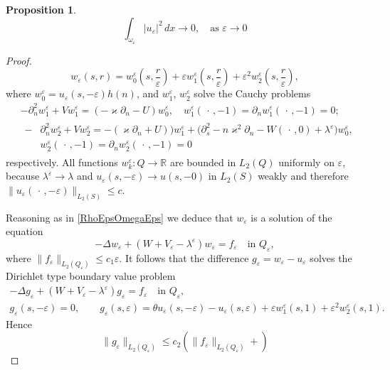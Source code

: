 \documentclass[reqno]{amsart}
\theoremstyle{plain}
\newtheorem{prop}{Proposition}
\numberwithin{equation}{section}
\renewcommand{\kappa}{\varkappa}
\newcommand{\Real}{\mathbb R}
\newcommand{\eps}{\varepsilon}
\renewcommand{\leq}{\leqslant}
\newcommand\nep{\textstyle\frac r\eps}
\newcommand{\pte}{\partial_n}
\begin{document}
\begin{prop}
  \begin{equation*}
    \int_{\omega_\eps}|u_\eps|^2\,dx\to 0,\quad\text{as } \eps\to 0
  \end{equation*}
\end{prop}
\begin{proof}
  \begin{equation*}
    w_\eps(s,r)=w_0^\eps\left(s,\nep\right)+\eps w_1^\eps\left(s,\nep\right)
    +\eps^2 w_2^\eps\left(s,\nep\right),
  \end{equation*}
 where $w_0^\eps=u_\eps(s,-\eps)h(n)$, and $w_1^\eps$, $w_2^\eps$ solve the Cauchy problems
 \begin{align*}
  &-\pte^2 w_1^\eps+Vw_1^\eps=(-\kappa\pte -U)w_0^\eps, \quad w_1^\eps(\,\cdot\,,-1)= \pte w_1^\eps(\,\cdot\,,-1)=0;\\
  &\begin{aligned}
  -&\pte^2 w_2^\eps+Vw_2^\eps=-(\kappa\pte +U)) w_1^\eps
  +\big(\partial^2_s-n\kappa^2\partial_n-W(\,\cdot\,,0)+\lambda^\eps\big)w_0^\eps, \\
   &w_2^\eps(\,\cdot\,,-1)= \pte w_2^\eps(\,\cdot\,,-1)=0
  \end{aligned}
\end{align*}
respectively. All functions $w_k^\eps\colon Q\to \Real$ are bounded in $L_2(Q)$ uniformly on $\eps$, because $\lambda^\eps\to \lambda$ and $u_\eps(s,-\eps)\to u(s,-0)$ in $L_2(S)$ weakly and therefore $\|u_\eps(\,\cdot\,,-\eps)\|_{L_2(S)}\leq c$.

Reasoning  as in  \eqref{RhoEpsOmegaEps} we deduce that $w_\eps$ is a solution of the equation
\begin{equation*}
  -\Delta w_\eps+(W+V_\eps-\lambda^\eps)w_\eps=f_\eps\quad \text{in } Q_\eps,
\end{equation*}
where $\|f_\eps\|_{L_2(Q_\eps)}\leq c_1 \eps$. It follows that the difference
$g_\eps=w_\eps-u_\eps$ solves the Dirichlet type boundary value problem
 \begin{gather*}
   -\Delta g_\eps+(W+V_\eps-\lambda^\eps)g_\eps=f_\eps\quad \text{in } Q_\eps, \\
   g_\eps(s,-\eps)=0, \qquad g_\eps(s,\eps)=\theta u_\eps(s,-\eps)-u_\eps(s,\eps)+\eps w_1^\eps(s,1)
    +\eps^2 w_2^\eps(s,1).
 \end{gather*}
 Hence
 \begin{equation*}
   \|g_\eps\|_{L_2(Q_\eps)}\leq c_2(\|f_\eps\|_{L_2(Q_\eps)}+)
 \end{equation*}
\end{proof}
\end{document}
